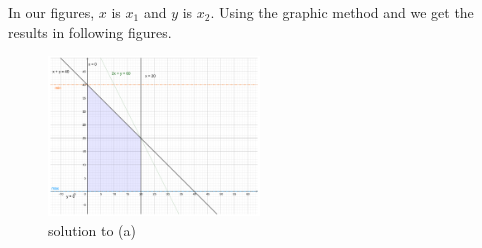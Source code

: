 \documentclass[12pt]{article}
\begin{document}
In our figures, $x$ is $x_1$ and $y$ is $x_2$. Using the graphic method and we get the results in following figures.

\begin{figure}[htbp]
  \caption{solution to (a)}
  \centering
    \includegraphics[width=0.5\textwidth]{2_8a.pdf}
\end{figure}
\end{document}
